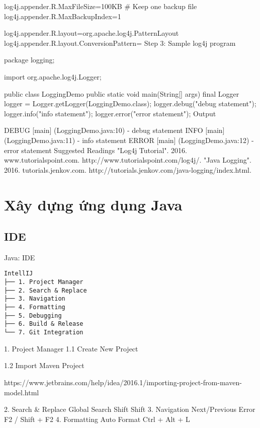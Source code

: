 log4j.appender.R.MaxFileSize=100KB
# Keep one backup file
log4j.appender.R.MaxBackupIndex=1

log4j.appender.R.layout=org.apache.log4j.PatternLayout
log4j.appender.R.layout.ConversionPattern=%
Step 3: Sample log4j program

package logging;

import org.apache.log4j.Logger;

public class LoggingDemo {
    public static void main(String[] args) {
        final Logger logger = Logger.getLogger(LoggingDemo.class);
        logger.debug("debug statement");
        logger.info("info statement");
        logger.error("error statement");
    }
}
Output

DEBUG [main] (LoggingDemo.java:10) - debug statement
 INFO [main] (LoggingDemo.java:11) - info statement
ERROR [main] (LoggingDemo.java:12) - error statement
Suggested Readings
"Log4j Tutorial". 2016. www.tutorialspoint.com. http://www.tutorialspoint.com/log4j/.
"Java Logging". 2016. tutorials.jenkov.com. http://tutorials.jenkov.com/java-logging/index.html.

\part{Xây dựng ứng dụng Java}

\chapter{IDE}

Java: IDE
\begin{lstlisting}
IntellIJ
├── 1. Project Manager
├── 2. Search & Replace
├── 3. Navigation
├── 4. Formatting
├── 5. Debugging
├── 6. Build & Release
└── 7. Git Integration
\end{lstlisting}

1. Project Manager
1.1 Create New Project

1.2 Import Maven Project

https://www.jetbrains.com/help/idea/2016.1/importing-project-from-maven-model.html

2. Search & Replace
Global Search	Shift Shift
3. Navigation
Next/Previous Error	F2 / Shift + F2
4. Formatting
Auto Format	Ctrl + Alt + L




















